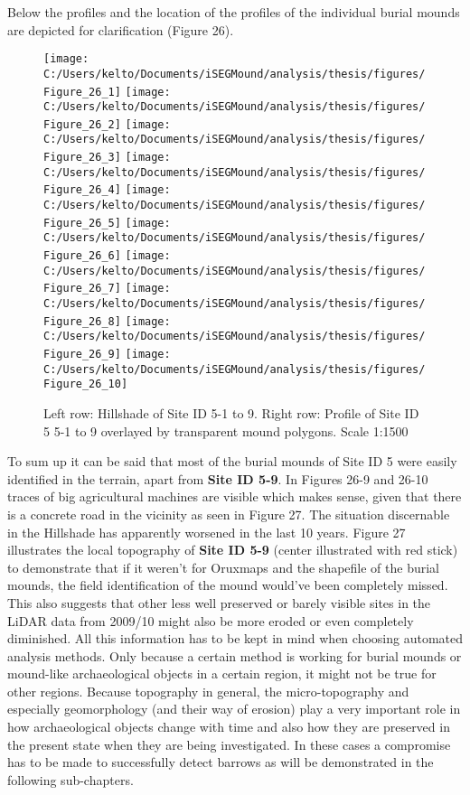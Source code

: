\documentclass[
  12pt,
]{article}
\begin{document}
Below the profiles and the location of the profiles of the individual burial mounds are depicted for clarification (Figure 26).

\begin{figure}
\texttt{[image: C:/Users/kelto/Documents/iSEGMound/analysis/thesis/figures/Figure\_26\_1]} \texttt{[image: C:/Users/kelto/Documents/iSEGMound/analysis/thesis/figures/Figure\_26\_2]} \texttt{[image: C:/Users/kelto/Documents/iSEGMound/analysis/thesis/figures/Figure\_26\_3]} \texttt{[image: C:/Users/kelto/Documents/iSEGMound/analysis/thesis/figures/Figure\_26\_4]} \texttt{[image: C:/Users/kelto/Documents/iSEGMound/analysis/thesis/figures/Figure\_26\_5]} \texttt{[image: C:/Users/kelto/Documents/iSEGMound/analysis/thesis/figures/Figure\_26\_6]} \texttt{[image: C:/Users/kelto/Documents/iSEGMound/analysis/thesis/figures/Figure\_26\_7]} \texttt{[image: C:/Users/kelto/Documents/iSEGMound/analysis/thesis/figures/Figure\_26\_8]} \texttt{[image: C:/Users/kelto/Documents/iSEGMound/analysis/thesis/figures/Figure\_26\_9]} \texttt{[image: C:/Users/kelto/Documents/iSEGMound/analysis/thesis/figures/Figure\_26\_10]} \caption{Left row: Hillshade of Site ID 5-1 to 9. Right row: Profile of Site ID 5 5-1 to 9 overlayed by transparent mound polygons. Scale 1:1500}\label{fig:Figure26}
\end{figure}

To sum up it can be said that most of the burial mounds of Site ID 5 were easily identified in the terrain, apart from \textbf{Site ID 5-9}. In Figures 26-9 and 26-10 traces of big agricultural machines are visible which makes sense, given that there is a concrete road in the vicinity as seen in Figure 27. The situation discernable in the Hillshade has apparently worsened in the last 10 years. Figure 27 illustrates the local topography of \textbf{Site ID 5-9} (center illustrated with red stick) to demonstrate that if it weren't for Oruxmaps and the shapefile of the burial mounds, the field identification of the mound would've been completely missed. This also suggests that other less well preserved or barely visible sites in the LiDAR data from 2009/10 might also be more eroded or even completely diminished.
All this information has to be kept in mind when choosing automated analysis methods. Only because a certain method is working for burial mounds or mound-like archaeological objects in a certain region, it might not be true for other regions. Because topography in general, the micro-topography and especially geomorphology (and their way of erosion) play a very important role in how archaeological objects change with time and also how they are preserved in the present state when they are being investigated. In these cases a compromise has to be made to successfully detect barrows as will be demonstrated in the following sub-chapters.
\end{document}
